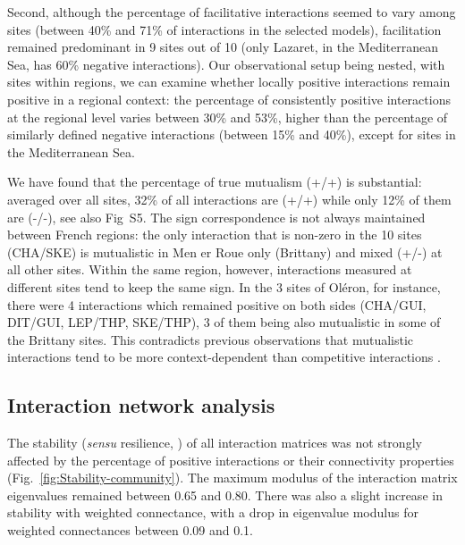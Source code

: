 \documentclass[10pt]{article}
\begin{document}
Second, although the percentage of facilitative interactions seemed
to vary among sites (between 40\% and 71\% of interactions in the
selected models), facilitation remained predominant in 9 sites out
of 10 (only Lazaret, in the Mediterranean Sea, has 60\% negative interactions).
Our observational setup being nested, with sites within regions, we
can examine whether locally positive interactions remain positive
in a regional context: the percentage of consistently positive interactions
at the regional level varies between 30\% and 53\%, higher than the
percentage of similarly defined negative interactions (between 15\%
and 40\%), except for sites in the Mediterranean Sea.

We have found that the percentage of true mutualism (+/+) is substantial:
averaged over all sites, 32\% of all interactions are (+/+) while
only 12\% of them are (-/-), see also Fig~S5. The sign correspondence
is not always maintained between French regions: the only interaction
that is non-zero in the 10 sites (CHA/SKE) is mutualistic in Men er
Roue only (Brittany) and mixed (+/-) at all other sites. Within the
same region, however, interactions measured at different sites tend
to keep the same sign. In the 3 sites of Oléron, for instance, there
were 4 interactions which remained positive on both sides (CHA/GUI,
DIT/GUI, LEP/THP, SKE/THP), 3 of them being also mutualistic in some
of the Brittany sites. This contradicts previous observations that
mutualistic interactions tend to be more context-dependent than competitive
interactions \citep{chamberlain_how_2014}.

\subsection*{Interaction network analysis}

The stability (\emph{sensu} resilience, \citealt{ives_stability_2007})
of all interaction matrices was not strongly affected by the percentage
of positive interactions or their connectivity properties (Fig.~\ref{fig:Stability-community}).
The maximum modulus of the interaction matrix eigenvalues remained
between 0.65 and 0.80. There was also a slight increase in stability
with weighted connectance, with a drop in eigenvalue modulus for weighted
connectances between 0.09 and 0.1.
\end{document}
